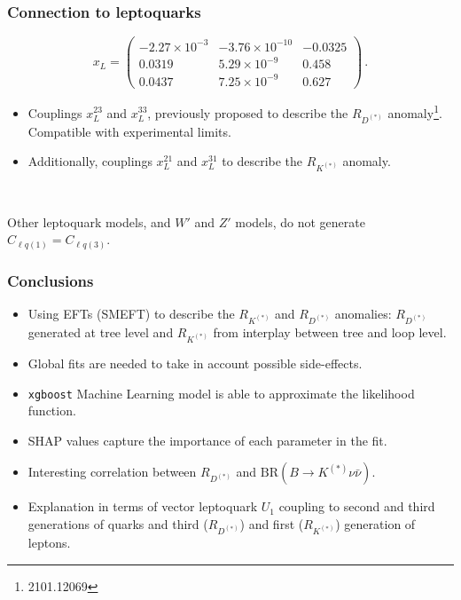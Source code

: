 \documentclass[mathserif, 10pt]{beamer}
\begin{document}
\begin{frame}
    \frametitle{Connection to leptoquarks}

    $$x_L = \begin{pmatrix}
        -2.27\times10^{-3} & -3.76\times 10^{-10}  & -0.0325 \\
        0.0319 & 5.29\times 10^{-9} &  0.458\\
        0.0437  & 7.25\times 10^{-9}  & 0.627
        \end{pmatrix}\,.
    $$
    \begin{itemize}
        \item Couplings $x_L^{23}$ and $x_L^{33}$, previously proposed to describe the $R_{D^{(*)}}$ anomaly\footnote[1]{2101.12069}. Compatible with experimental limits.
        \item Additionally, couplings $x_L^{21}$ and $x_L^{31}$ to describe the $R_{K^{(*)}}$ anomaly. 
    \end{itemize}

    ~
    
    Other leptoquark models, and $W'$ and $Z'$ models, do not generate $C_{\ell q(1)} = C_{\ell q (3)}$. 
\end{frame}

\begin{frame}
    \frametitle{Conclusions}

    \begin{itemize}
        \item Using EFTs (SMEFT) to describe the $R_{K^{(*)}}$ and $R_{D^{(*)}}$ anomalies: $R_{D^{(*)}}$ generated at tree level and $R_{K^{(*)}}$ from interplay between tree and loop level.
        \item Global fits are needed to take in account possible side-effects. 
        \item \texttt{xgboost} Machine Learning model is able to approximate the likelihood function.
        \item SHAP values capture the importance of each parameter in the fit.
        \item Interesting correlation between $R_{D^{(*)}}$ and $\mathrm{BR}(B\to K^{(*)}\nu\bar{\nu})$.
        \item Explanation in terms of vector leptoquark $U_1$ coupling to second and third generations of quarks and third ($R_{D^{(*)}}$) and first ($R_{K^{(*)}}$) generation of leptons.
    \end{itemize}

\end{frame}
\end{document}
